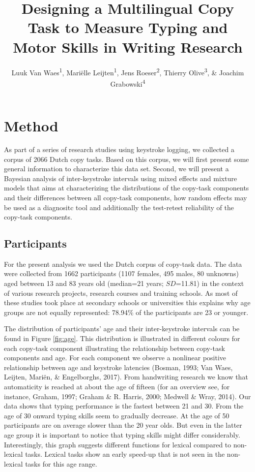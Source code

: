 \documentclass[,man,floatsintext]{apa6}
\title{Designing a Multilingual Copy Task to Measure Typing and Motor Skills in Writing Research}
\author{Luuk Van Waes\textsuperscript{1}, Mariëlle Leijten\textsuperscript{1}, Jens Roeser\textsuperscript{2}, Thierry Olive\textsuperscript{3}, \& Joachim Grabowski\textsuperscript{4}}
\date{}
\affiliation{
\vspace{0.5cm}
\textsuperscript{1} Department of Management, University of Antwerp, Belgium\\\textsuperscript{2} Department of Psychology, Nottingham Trent University, United Kingdom\\\textsuperscript{3} Research Centre on Cognition and Learning (CeRCA), CNRS, University of Poitiers, France\\\textsuperscript{4} Institute for Psychology, Leibniz University Hanover, Germany}
\begin{document}
\maketitle

\hypertarget{method}{%
\section{Method}\label{method}}

As part of a series of research studies using keystroke logging, we collected a corpus of 2066 Dutch copy tasks. Based on this corpus, we will first present some general information to characterize this data set. Second, we will present a Bayesian analysis of inter-keystroke intervals using mixed effects and mixture models that aims at characterizing the distributions of the copy-task components and their differences between all copy-task components, how random effects may be used as a diagnositc tool and additionally the test-retest reliability of the copy-task components.

\hypertarget{participants}{%
\subsection{Participants}\label{participants}}

For the present analysis we used the Dutch corpus of copy-task data. The data were collected from 1662 participants (1107 females, 495 males, 80 unknowns) aged between 13 and 83 years old (median=21 years; \(SD\)=11.81) in the context of various research projects, research courses and training schools. As most of these studies took place at secondary schools or universities this explains why age groups are not equally represented: 78.94\% of the participants are 23 or younger.

The distribution of participants' age and their inter-keystroke intervals can be found in Figure \ref{fig:age}. This distribution is illustrated in different colours for each copy-task component illustrating the relationship between copy-task components and age. For each component we observe a nonlinear positive relationship between age and keystroke latencies (Bosman, 1993; Van Waes, Leijten, Mariën, \& Engelborghs, 2017). From handwriting research we know that automaticity is reached at about the age of fifteen (for an overview see, for instance, Graham, 1997; Graham \& R. Harris, 2000; Medwell \& Wray, 2014). Our data shows that typing performance is the fastest between 21 and 30. From the age of 30 onward typing skills seem to gradually decrease. At the age of 50 participants are on average slower than the 20 year olds. But even in the latter age group it is important to notice that typing skills might differ considerably. Interestingly, this graph suggests different functions for lexical compared to non-lexical tasks. Lexical tasks show an early speed-up that is not seen in the non-lexical tasks for this age range.
\end{document}
